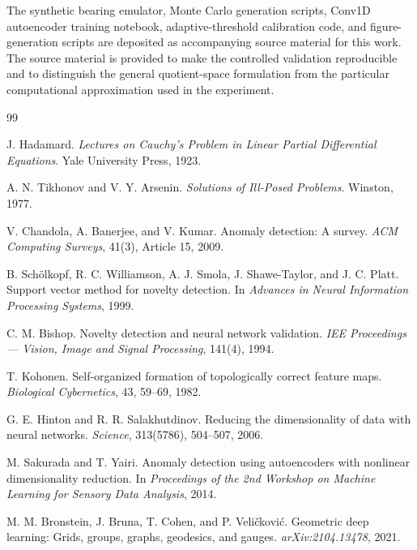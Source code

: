 \documentclass[11pt,letterpaper]{article}
\begin{document}
The synthetic bearing emulator, Monte Carlo generation scripts, Conv1D autoencoder training notebook, adaptive-threshold calibration code, and figure-generation scripts are deposited as accompanying source material for this work.
The source material is provided to make the controlled validation reproducible and to distinguish the general quotient-space formulation from the particular computational approximation used in the experiment.

\begin{thebibliography}{99}

J. Hadamard.
\newblock \emph{Lectures on Cauchy's Problem in Linear Partial Differential Equations}.
\newblock Yale University Press, 1923.

A. N. Tikhonov and V. Y. Arsenin.
\newblock \emph{Solutions of Ill-Posed Problems}.
\newblock Winston, 1977.

V. Chandola, A. Banerjee, and V. Kumar.
\newblock Anomaly detection: A survey.
\newblock \emph{ACM Computing Surveys}, 41(3), Article 15, 2009.

B. Sch\"olkopf, R. C. Williamson, A. J. Smola, J. Shawe-Taylor, and J. C. Platt.
\newblock Support vector method for novelty detection.
\newblock In \emph{Advances in Neural Information Processing Systems}, 1999.

C. M. Bishop.
\newblock Novelty detection and neural network validation.
\newblock \emph{IEE Proceedings --- Vision, Image and Signal Processing}, 141(4), 1994.

T. Kohonen.
\newblock Self-organized formation of topologically correct feature maps.
\newblock \emph{Biological Cybernetics}, 43, 59--69, 1982.

G. E. Hinton and R. R. Salakhutdinov.
\newblock Reducing the dimensionality of data with neural networks.
\newblock \emph{Science}, 313(5786), 504--507, 2006.

M. Sakurada and T. Yairi.
\newblock Anomaly detection using autoencoders with nonlinear dimensionality reduction.
\newblock In \emph{Proceedings of the 2nd Workshop on Machine Learning for Sensory Data Analysis}, 2014.

M. M. Bronstein, J. Bruna, T. Cohen, and P. Veli\v{c}kovi\'c.
\newblock Geometric deep learning: Grids, groups, graphs, geodesics, and gauges.
\newblock \emph{arXiv:2104.13478}, 2021.


\end{thebibliography}
\end{document}
